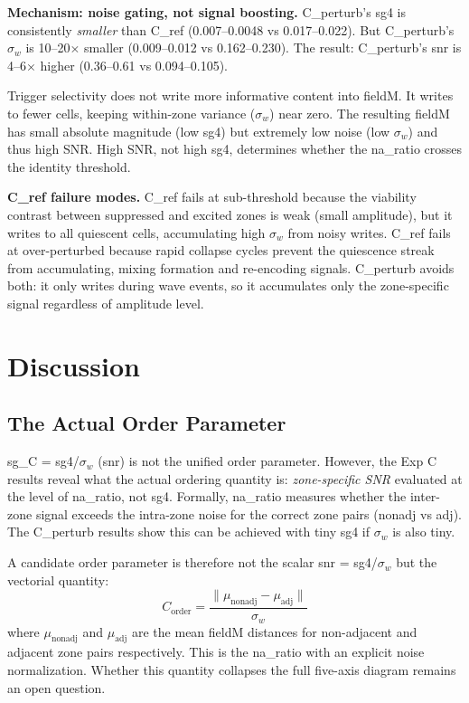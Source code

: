 \documentclass[11pt,a4paper]{article}
\begin{document}
\textbf{Mechanism: noise gating, not signal boosting.}
C\_perturb's sg4 is consistently \emph{smaller} than C\_ref (0.007--0.0048 vs
0.017--0.022).
But C\_perturb's $\sigma_w$ is 10--20$\times$ smaller (0.009--0.012 vs 0.162--0.230).
The result: C\_perturb's snr is 4--6$\times$ higher (0.36--0.61 vs 0.094--0.105).

Trigger selectivity does not write more informative content into fieldM.
It writes to fewer cells, keeping within-zone variance ($\sigma_w$) near zero.
The resulting fieldM has small absolute magnitude (low sg4) but extremely low
noise (low $\sigma_w$) and thus high SNR.
High SNR, not high sg4, determines whether the na\_ratio crosses the identity
threshold.

\textbf{C\_ref failure modes.}
C\_ref fails at sub-threshold because the viability contrast between
suppressed and excited zones is weak (small amplitude), but it writes to all
quiescent cells, accumulating high $\sigma_w$ from noisy writes.
C\_ref fails at over-perturbed because rapid collapse cycles prevent the
quiescence streak from accumulating, mixing formation and re-encoding signals.
C\_perturb avoids both: it only writes during wave events, so it accumulates
only the zone-specific signal regardless of amplitude level.

\section{Discussion}

\subsection{The Actual Order Parameter}

sg\_C = sg4/$\sigma_w$ (snr) is not the unified order parameter.
However, the Exp C results reveal what the actual ordering quantity is:
\emph{zone-specific SNR} evaluated at the level of na\_ratio, not sg4.
Formally, na\_ratio measures whether the inter-zone signal exceeds the
intra-zone noise for the correct zone pairs (nonadj vs adj).
The C\_perturb results show this can be achieved with tiny sg4 if $\sigma_w$ is
also tiny.

A candidate order parameter is therefore not the scalar snr = sg4/$\sigma_w$
but the vectorial quantity:
\begin{equation}
  C_\text{order} = \frac{\|\mu_\text{nonadj} - \mu_\text{adj}\|}{\sigma_w}
\end{equation}
where $\mu_\text{nonadj}$ and $\mu_\text{adj}$ are the mean fieldM distances
for non-adjacent and adjacent zone pairs respectively.
This is the na\_ratio with an explicit noise normalization.
Whether this quantity collapses the full five-axis diagram remains an open
question.
\end{document}

